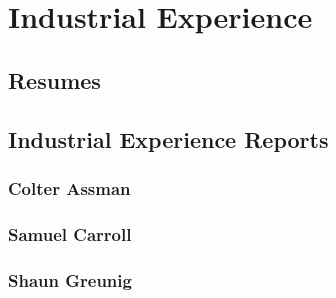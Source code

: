 
\chapter{Industrial Experience}

\section{Resumes}


%     
%     
%     

\section{Industrial Experience Reports}

\subsection{Colter Assman}


\subsection{Samuel Carroll}


\subsection{Shaun Greunig}


